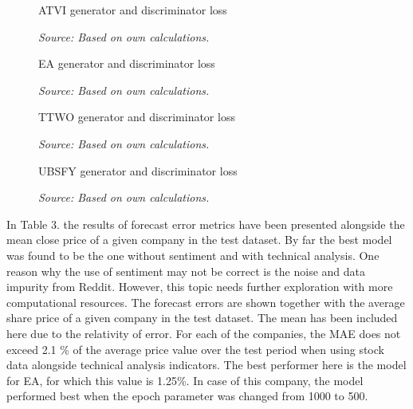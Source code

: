\documentclass[11pt]{article} %
\begin{document}
\begin{figure}[H]
\caption{ATVI generator and discriminator loss}
\begin{adjustbox}{width=1.3\textwidth,center}

\end{adjustbox}
\caption*{\textit{Source: Based on own calculations.}}
\end{figure}

\begin{figure}[H]
\caption{EA generator and discriminator loss}
\begin{adjustbox}{width=1.3\textwidth,center}

\end{adjustbox}
\caption*{\textit{Source: Based on own calculations.}}
\end{figure}


\begin{figure}[H]
\caption{TTWO generator and discriminator loss}
\begin{adjustbox}{width=1.3\textwidth,center}

\end{adjustbox}
\caption*{\textit{Source: Based on own calculations.}}
\end{figure}

\begin{figure}[H]
\caption{UBSFY generator and discriminator loss}
\begin{adjustbox}{width=1.3\textwidth,center}

\end{adjustbox}
\caption*{\textit{Source: Based on own calculations.}}
\end{figure}


In Table 3. the results of forecast error metrics have been presented alongside the mean close price of a given company in the test dataset. By far the best model was found to be the one without sentiment and with technical analysis. One reason why the use of sentiment may not be correct is the noise and data impurity from Reddit. However, this topic needs further exploration with more computational resources. 
The forecast errors are shown together with the average share price of a given company in the test dataset. The mean has been included here due to the relativity of error. For each of the companies, the MAE does not exceed 2.1 \% of the average price value over the test period when using stock data alongside technical analysis indicators. The best performer here is the model for EA, for which this value is 1.25\%. In case of this company, the model performed best when the epoch parameter was changed from 1000 to 500.
\end{document}
